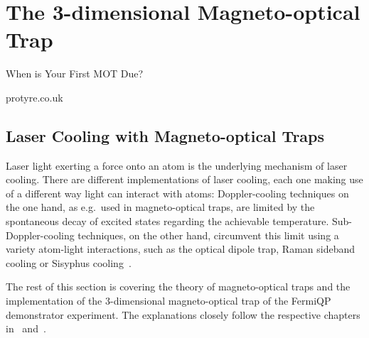 \renewcommand{\imagepath}{../30-mot/img}

\chapter{The 3-dimensional Magneto-optical Trap}
\epigraph{When is Your First MOT Due?}{protyre.co.uk}


\section{Laser Cooling with Magneto-optical Traps}

Laser light exerting a force onto an atom is the underlying mechanism of laser cooling. There are different implementations of laser cooling, each one making use of a different way light can interact with atoms: Doppler-cooling techniques on the one hand, as e.g.\ used in magneto-optical traps, are limited by the spontaneous decay of excited states regarding the achievable temperature. Sub-Doppler-cooling techniques, on the other hand, circumvent this limit using a variety atom-light interactions, such as the optical dipole trap, Raman sideband cooling or Sisyphus cooling~\cite{foot_atomic_2005}.

The rest of this section is covering the theory of magneto-optical traps and the implementation of the 3-dimensional magneto-optical trap of the FermiQP demonstrator experiment. The explanations closely follow the respective chapters in~\cite{foot_atomic_2005} and~\cite{metcalf_laser_1999}.

